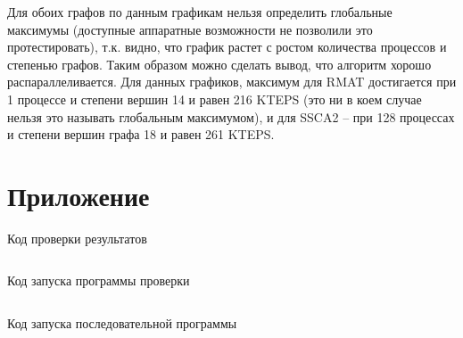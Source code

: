 \documentclass[12pt, a4paper]{article}
\begin{document}
        Для обоих графов по данным графикам нельзя определить глобальные максимумы (доступные аппаратные возможности не позволили это протестировать), т.к. видно, что график растет с ростом количества процессов и степенью графов. Таким образом можно сделать вывод, что алгоритм хорошо распараллеливается. Для данных графиков, максимум для RMAT достигается при 1 процессе и степени вершин 14 и равен 216 KTEPS (это ни в коем случае нельзя это называть глобальным максимумом), и для SSCA2 -- при 128 процессах и степени вершин графа 18 и равен 261 KTEPS.

    \newpage
    \section{Приложение}
        \begin{listing}[H]
            \caption{Код проверки результатов}
            \label{code:check.cpp}
            \inputminted[breaklines=true,fontsize=\scriptsize,frame=single]{cpp}{check.cpp}
        \end{listing}

        \begin{listing}[H]
            \caption{Код запуска программы проверки}
            \label{code:check.sh}
            \inputminted[breaklines=true,fontsize=\scriptsize,frame=single]{bash}{check.sh}
        \end{listing}

        \begin{listing}[H]
            \caption{Код запуска последовательной программы}
            \label{code:run_st.sh}
            \inputminted[breaklines=true,fontsize=\scriptsize,frame=single]{bash}{run_st.sh}
        \end{listing}
\end{document}
